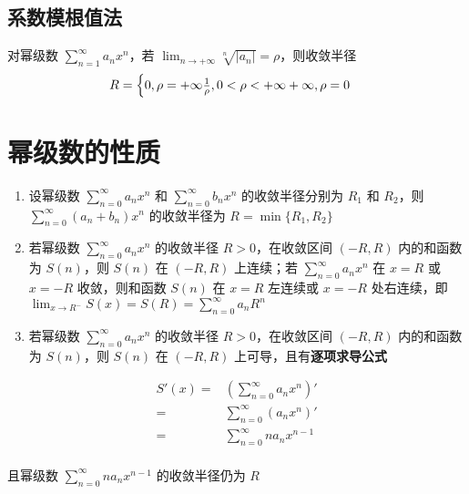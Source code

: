 \documentclass[lang = zh , final , oneside , openany , titlepage , zihao = -4 , linespread = 1.3 , baselineskip = false , cjk-font = windows , text-font = newtx , math-font = newtx , math-style = ISO , uppercase-greek = upright , integral-limits = false]{sjtureport}
\begin{document}
\subsection{系数模根值法}

\begin{theorem}
    对幂级数 \(\displaystyle \sum_{n=1}^\infty a_nx^n\)，若
\(\displaystyle \lim_{n\to+\infty}\sqrt[n]{\left\vert a_n\right\vert} = \rho\)，则收敛半径
\[\displaystyle R=\begin{cases}0,\rho=+\infty\newline  \frac{1}{\rho}, 0<\rho<+\infty\newline +\infty ,\rho=0\end{cases}\]
\end{theorem}

\section{幂级数的性质}

\begin{enumerate}
\item
  设幂级数 \(\displaystyle \sum_{n=0}^\infty a_nx^n\) 和
  \(\displaystyle \sum_{n=0}^\infty b_nx^n\) 的收敛半径分别为 \(R_1\) 和
  \(R_2\)，则 \(\displaystyle \sum_{n=0}^\infty (a_n+b_n)x^n\)
  的收敛半径为 \(R=\min\{R_1,R_2\}\)
\item
  若幂级数 \(\displaystyle \sum_{n=0}^\infty a_nx^n\) 的收敛半径
  \(R>0\)，在收敛区间 \((-R,R)\) 内的和函数为 \(S(n)\)，则 \(S(n)\) 在
  \((-R,R)\) 上连续；若 \(\displaystyle\sum_{n=0}^\infty a_nx^n\) 在
  \(x=R\) 或 \(x=-R\) 收敛，则和函数 \(S(n)\) 在 \(x=R\) 左连续或
  \(x=-R\) 处右连续，即
  \(\displaystyle \lim_{x\to R^-}S(x)=S(R)=\sum_{n=0}^\infty a_nR^n\)
\item
  若幂级数 \(\displaystyle \sum_{n=0}^\infty a_nx^n\) 的收敛半径
  \(R>0\)，在收敛区间 \((-R,R)\) 内的和函数为 \(S(n)\)，则 \(S(n)\) 在
  \((-R,R)\) 上可导，且有\textbf{逐项求导公式}
\end{enumerate}

\[\begin{aligned}
  S'(x) = &\left(\sum_{n=0}^\infty a_nx^n\right)'\\
    = &\sum_{n=0}^\infty \left(a_nx^n\right)'\\
    = &\sum_{n=0}^\infty na_nx^{n-1}\\
  \end{aligned}\]

且幂级数 \(\displaystyle \sum_{n=0}^\infty na_nx^{n-1}\) 的收敛半径仍为
\(R\)
\end{document}
